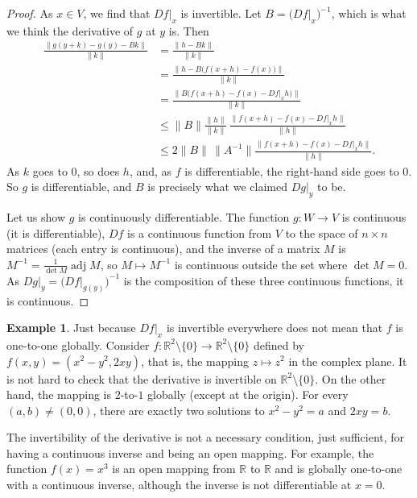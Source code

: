 \documentclass[12pt,openany]{book}
\newcommand{\snorm}[1]{\lVert {#1} \rVert}
\newcommand{\R}{{\mathbb{R}}}
\theoremstyle{plain}
\theoremstyle{remark}
\theoremstyle{definition}
\theoremstyle{exercise}
\theoremstyle{example}
\newtheorem{example}[thm]{Example}
\begin{document}
\begin{proof}
As $x \in V$, we find that $Df|_x$ is invertible.
Let $B = \bigl(Df|_x\bigr)^{-1}$, which is what we think the derivative of
$g$ at $y$ is.  Then
\begin{equation*}
\begin{split}
\frac{\snorm{g(y+k)-g(y)-Bk}}{\snorm{k}}
& =
\frac{\snorm{h-Bk}}{\snorm{k}}
\\
& =
\frac{\snorm{h-B\bigl(f(x+h)-f(x)\bigr)}}{\snorm{k}}
\\
& =
\frac{\snorm{B\bigl(f(x+h)-f(x)-Df|_x h\bigr)}}{\snorm{k}}
\\
& \leq
\snorm{B}
\frac{\snorm{h}}{\snorm{k}}\,
\frac{\snorm{f(x+h)-f(x)-Df|_x h}}{\snorm{h}}
\\
& \leq
2\snorm{B} \, \snorm{A^{-1}}
\frac{\snorm{f(x+h)-f(x)-Df|_x h}}{\snorm{h}} .
\end{split}
\end{equation*}
As $k$ goes to $0$, so does $h$,
and, as $f$ is differentiable,
the right-hand side goes to $0$.
So $g$ is differentiable, and $B$
is precisely what we claimed $Dg|_y$ to be.

Let us show $g$ is continuously
differentiable.
The function $g \colon W \to V$ is continuous (it is differentiable),
$Df$ is a continuous function from $V$
to the space of $n \times n$ matrices (each entry is continuous),
and the inverse of a matrix $M$ is $M^{-1} = \frac{1}{\det M} \operatorname{adj} M$,
so $M \mapsto M^{-1}$ is continuous outside the set where $\det M = 0$.
As
$Dg|_y = {\bigl( Df|_{g(y)}\bigr)}^{-1}$ is the composition
of these three
continuous functions, it is continuous.
\end{proof}

\begin{example}
Just because $Df|_x$ is invertible everywhere does not
mean that $f$ is
one-to-one globally.
Consider $f \colon \R^2 \setminus \{ 0 \} \to \R^2 \setminus \{ 0 \}$ defined
by $f(x,y) = (x^2-y^2,2xy)$,  that is, the mapping $z \mapsto z^2$ in the
complex plane.  It is not hard to check that
the derivative is invertible on $\R^2 \setminus \{ 0 \}$.
On the other hand, the mapping is $2$-to-$1$ globally (except at the origin).
For every $(a,b) \neq (0,0)$, there are exactly two
solutions to $x^2-y^2=a$ and $2xy=b$.
\end{example}

The invertibility of the derivative is not a necessary
condition, just sufficient, for having a continuous inverse and being an open
mapping.  For example, the function $f(x) = x^3$ is an open mapping from $\R$
to $\R$ and is globally one-to-one with a continuous inverse, although the
inverse is not differentiable at $x=0$.
\end{document}
